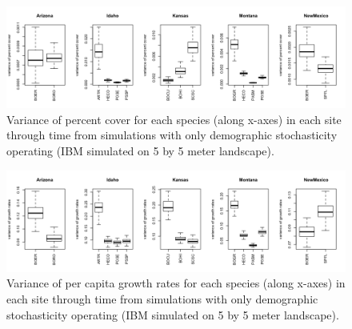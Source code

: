 \documentclass[12pt,]{article}
\begin{document}
\newpage{}

\begin{figure}[!ht]
  \centering
      \includegraphics[width=6in]{./components/formatted_figures/demographic_variances_cover.png}
  \caption{Variance of percent cover for each species (along x-axes) in each site through time from simulations with only demographic stochasticity operating (IBM simulated on 5 by 5 meter landscape).}
\end{figure}

\begin{figure}[!ht]
  \centering
      \includegraphics[width=6in]{./components/formatted_figures/demographic_variances_pgr.png}
  \caption{Variance of per capita growth rates for each species (along x-axes) in each site through time from simulations with only demographic stochasticity operating (IBM simulated on 5 by 5 meter landscape).}
\end{figure}

\pagebreak{}
\end{document}
